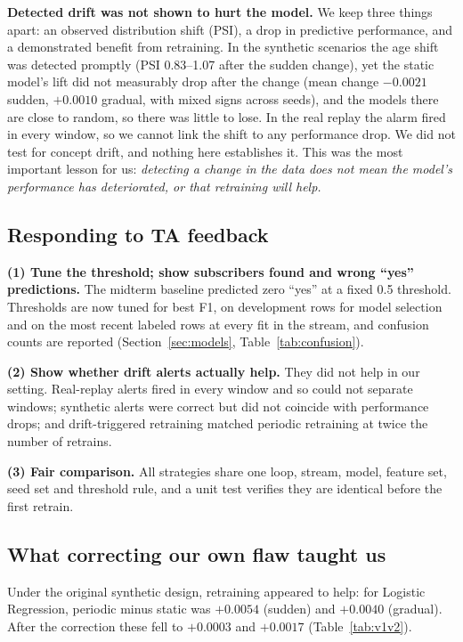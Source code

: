\documentclass[conference]{IEEEtran}
\begin{document}
\textbf{Detected drift was not shown to hurt the model.} We keep three things apart: an observed distribution shift (PSI), a drop in predictive performance, and a demonstrated benefit from retraining. In the synthetic scenarios the age shift was detected promptly (PSI 0.83--1.07 after the sudden change), yet the static model's lift did not measurably drop after the change (mean change $-0.0021$ sudden, $+0.0010$ gradual, with mixed signs across seeds), and the models there are close to random, so there was little to lose. In the real replay the alarm fired in every window, so we cannot link the shift to any performance drop. We did not test for concept drift, and nothing here establishes it. This was the most important lesson for us: \emph{detecting a change in the data does not mean the model's performance has deteriorated, or that retraining will help.}

\subsection{Responding to TA feedback}

\textbf{(1) Tune the threshold; show subscribers found and wrong ``yes'' predictions.} The midterm baseline predicted zero ``yes'' at a fixed 0.5 threshold. Thresholds are now tuned for best F1, on development rows for model selection and on the most recent labeled rows at every fit in the stream, and confusion counts are reported (Section~\ref{sec:models}, Table~\ref{tab:confusion}).

\textbf{(2) Show whether drift alerts actually help.} They did not help in our setting. Real-replay alerts fired in every window and so could not separate windows; synthetic alerts were correct but did not coincide with performance drops; and drift-triggered retraining matched periodic retraining at twice the number of retrains.

\textbf{(3) Fair comparison.} All strategies share one loop, stream, model, feature set, seed set and threshold rule, and a unit test verifies they are identical before the first retrain.

\subsection{What correcting our own flaw taught us}

Under the original synthetic design, retraining appeared to help: for Logistic Regression, periodic minus static was $+0.0054$ (sudden) and $+0.0040$ (gradual). After the correction these fell to $+0.0003$ and $+0.0017$ (Table~\ref{tab:v1v2}).
\end{document}
